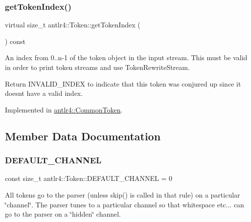 \mbox{\label{classantlr4_1_1Token_aaa5bda604b301abc3a84bc0f477750d5}} 
\subsubsection{\texorpdfstring{get\+Token\+Index()}{getTokenIndex()}}
{\footnotesize\ttfamily virtual size\+\_\+t antlr4\+::\+Token\+::get\+Token\+Index (\begin{DoxyParamCaption}{ }\end{DoxyParamCaption}) const\hspace{0.3cm}{\ttfamily [pure virtual]}}

An index from 0..n-\/1 of the token object in the input stream. This must be valid in order to print token streams and use Token\+Rewrite\+Stream.

Return I\+N\+V\+A\+L\+I\+D\+\_\+\+I\+N\+D\+EX to indicate that this token was conjured up since it doesn\textquotesingle{}t have a valid index. 

Implemented in \hyperlink{classantlr4_1_1CommonToken_ae94edeb1c320914502ca30a89332c5ef}{antlr4\+::\+Common\+Token}.



\subsection{Member Data Documentation}
\mbox{\label{classantlr4_1_1Token_a699cbc56affbddc079561e175cba8435}} 
\subsubsection{\texorpdfstring{D\+E\+F\+A\+U\+L\+T\+\_\+\+C\+H\+A\+N\+N\+EL}{DEFAULT\_CHANNEL}}
{\footnotesize\ttfamily const size\+\_\+t antlr4\+::\+Token\+::\+D\+E\+F\+A\+U\+L\+T\+\_\+\+C\+H\+A\+N\+N\+EL = 0\hspace{0.3cm}{\ttfamily [static]}}

All tokens go to the parser (unless skip() is called in that rule) on a particular \char`\"{}channel\char`\"{}. The parser tunes to a particular channel so that whitespace etc... can go to the parser on a \char`\"{}hidden\char`\"{} channel. \mbox{\label{classantlr4_1_1Token_aed7bace05b57d7e1cc1dac0c79390b0a}} 

